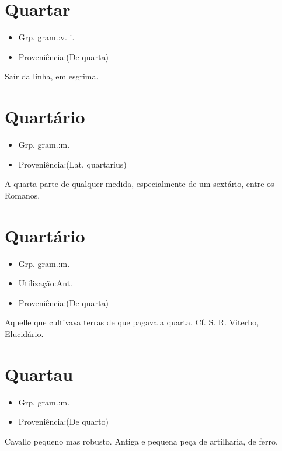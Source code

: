 \section{Quartar}
\begin{itemize}
\item {Grp. gram.:v. i.}
\end{itemize}
\begin{itemize}
\item {Proveniência:(De \textunderscore quarta\textunderscore )}
\end{itemize}
Saír da linha, em esgrima.
\section{Quartário}
\begin{itemize}
\item {Grp. gram.:m.}
\end{itemize}
\begin{itemize}
\item {Proveniência:(Lat. \textunderscore quartarius\textunderscore )}
\end{itemize}
A quarta parte de qualquer medida, especialmente de um sextário, entre os Romanos.
\section{Quartário}
\begin{itemize}
\item {Grp. gram.:m.}
\end{itemize}
\begin{itemize}
\item {Utilização:Ant.}
\end{itemize}
\begin{itemize}
\item {Proveniência:(De \textunderscore quarta\textunderscore )}
\end{itemize}
Aquelle que cultivava terras de que pagava a quarta. Cf. S. R. Viterbo, \textunderscore Elucidário\textunderscore .
\section{Quartau}
\begin{itemize}
\item {Grp. gram.:m.}
\end{itemize}
\begin{itemize}
\item {Proveniência:(De \textunderscore quarto\textunderscore )}
\end{itemize}
Cavallo pequeno mas robusto.
Antiga e pequena peça de artilharia, de ferro.

